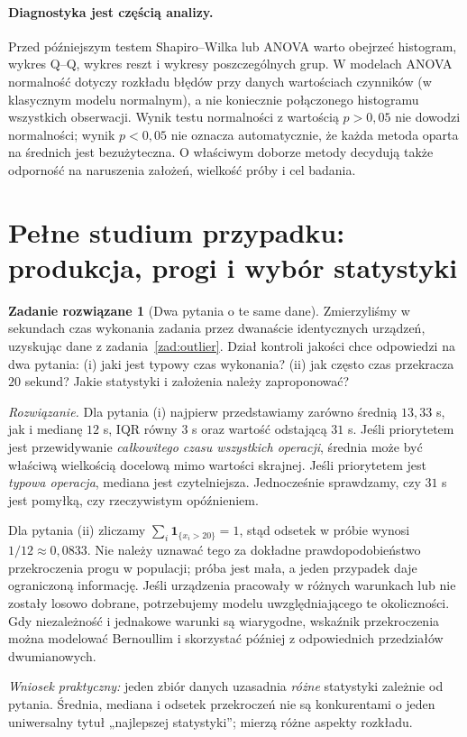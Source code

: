 \documentclass[11pt,a4paper,oneside]{report}
\numberwithin{equation}{chapter}
\theoremstyle{plain}
\theoremstyle{definition}
\newtheorem{zadanie}{Zadanie rozwiązane}[chapter]
\theoremstyle{remark}
\newcommand{\ind}[1]{\mathbf 1_{#1}}
\begin{document}
\paragraph{Diagnostyka jest częścią analizy.}
Przed późniejszym testem Shapiro--Wilka lub ANOVA warto obejrzeć histogram, wykres Q--Q, wykres reszt i wykresy poszczególnych grup. W modelach ANOVA normalność dotyczy rozkładu błędów przy danych wartościach czynników (w klasycznym modelu normalnym), a nie koniecznie połączonego histogramu wszystkich obserwacji. Wynik testu normalności z wartością $p>0{,}05$ nie dowodzi normalności; wynik $p<0{,}05$ nie oznacza automatycznie, że każda metoda oparta na średnich jest bezużyteczna. O właściwym doborze metody decydują także odporność na naruszenia założeń, wielkość próby i cel badania.

\section{Pełne studium przypadku: produkcja, progi i wybór statystyki}\label{sec:case-study}
\begin{zadanie}[Dwa pytania o te same dane]\label{zad:full-case}
Zmierzyliśmy w sekundach czas wykonania zadania przez dwanaście identycznych urządzeń, uzyskując dane z zadania~\ref{zad:outlier}. Dział kontroli jakości chce odpowiedzi na dwa pytania: (i) jaki jest typowy czas wykonania? (ii) jak często czas przekracza $20$ sekund? Jakie statystyki i założenia należy zaproponować?
\par\emph{Rozwiązanie.} Dla pytania (i) najpierw przedstawiamy zarówno średnią $13{,}33$ s, jak i medianę $12$ s, IQR równy $3$ s oraz wartość odstającą $31$ s. Jeśli priorytetem jest przewidywanie \emph{całkowitego czasu wszystkich operacji}, średnia może być właściwą wielkością docelową mimo wartości skrajnej. Jeśli priorytetem jest \emph{typowa operacja}, mediana jest czytelniejsza. Jednocześnie sprawdzamy, czy $31$ s jest pomyłką, czy rzeczywistym opóźnieniem.

Dla pytania (ii) zliczamy $\sum_i\ind{\{x_i>20\}}=1$, stąd odsetek w próbie wynosi $1/12\approx0{,}0833$. Nie należy uznawać tego za dokładne prawdopodobieństwo przekroczenia progu w populacji; próba jest mała, a jeden przypadek daje ograniczoną informację. Jeśli urządzenia pracowały w różnych warunkach lub nie zostały losowo dobrane, potrzebujemy modelu uwzględniającego te okoliczności. Gdy niezależność i jednakowe warunki są wiarygodne, wskaźnik przekroczenia można modelować Bernoullim i skorzystać później z odpowiednich przedziałów dwumianowych.

\emph{Wniosek praktyczny:} jeden zbiór danych uzasadnia \emph{różne} statystyki zależnie od pytania. Średnia, mediana i odsetek przekroczeń nie są konkurentami o jeden uniwersalny tytuł „najlepszej statystyki”; mierzą różne aspekty rozkładu.
\end{zadanie}
\end{document}
